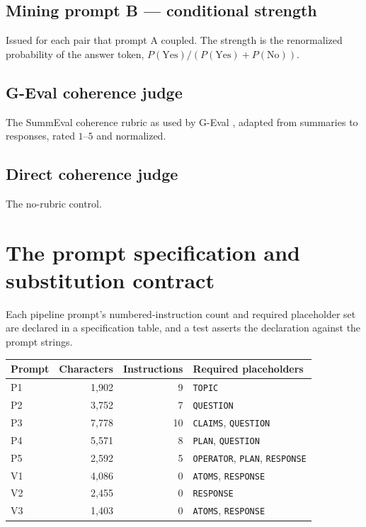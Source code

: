 \subsection{Mining prompt B --- conditional strength}
Issued for each pair that prompt A coupled. The strength is the renormalized probability of the answer token,
$P(\text{Yes})/(P(\text{Yes})+P(\text{No}))$.

\subsection{G-Eval coherence judge}
The SummEval coherence rubric as used by G-Eval \citep{geval,summeval}, adapted from summaries to responses, rated
$1$--$5$ and normalized.

\subsection{Direct coherence judge}
The no-rubric control.

\section{The prompt specification and substitution contract}
\label{app-spec}

Each pipeline prompt's numbered-instruction count and required placeholder set are declared in a specification table,
and a test asserts the declaration against the prompt strings.

\begin{center}\small
\begin{tabular}{@{}lrrl@{}}
\toprule
Prompt & Characters & Instructions & Required placeholders \\
\midrule
P1 & 1,902 & 9  & \texttt{TOPIC} \\
P2 & 3,752 & 7  & \texttt{QUESTION} \\
P3 & 7,778 & 10 & \texttt{CLAIMS}, \texttt{QUESTION} \\
P4 & 5,571 & 8  & \texttt{PLAN}, \texttt{QUESTION} \\
P5 & 2,592 & 5  & \texttt{OPERATOR}, \texttt{PLAN}, \texttt{RESPONSE} \\
V1 & 4,086 & 0  & \texttt{ATOMS}, \texttt{RESPONSE} \\
V2 & 2,455 & 0  & \texttt{RESPONSE} \\
V3 & 1,403 & 0  & \texttt{ATOMS}, \texttt{RESPONSE} \\
\bottomrule
\end{tabular}
\end{center}

